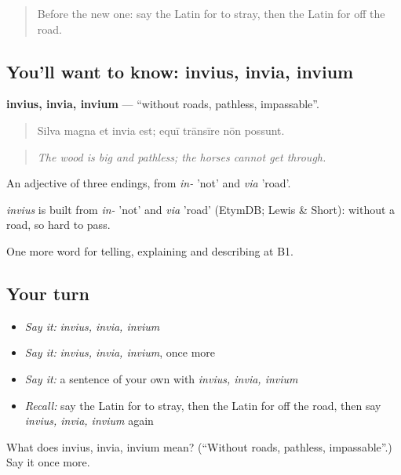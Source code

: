 \begin{quote}
Before the new one: say the Latin for to stray, then the Latin for off the road.
\end{quote}

\subsection*{You'll want to know: invius, invia, invium}
\textbf{invius, invia, invium} — \textquotedblleft{}without roads, pathless, impassable\textquotedblright{}.

\begin{quote}
Silva magna et invia est; equī trānsīre nōn possunt.
\end{quote}

\begin{quote}
\emph{The wood is big and pathless; the horses cannot get through.}
\end{quote}

An adjective of three endings, from \emph{in-} 'not' and \emph{via} 'road'.

\begin{cousinweb}
\emph{invius} is built from \emph{in-} 'not' and \emph{via} 'road' (EtymDB; Lewis \& Short): without a road, so hard to pass.
\end{cousinweb}

\begin{grammarlens}[title={What you've built}]
One more word for telling, explaining and describing at B1.
\end{grammarlens}

\subsection*{Your turn}
\begin{itemize}
\raggedright
  \item \emph{Say it:} \emph{invius, invia, invium}
  \item \emph{Say it:} \emph{invius, invia, invium}, once more
  \item \emph{Say it:} a sentence of your own with \emph{invius, invia, invium}
  \item \emph{Recall:} say the Latin for to stray, then the Latin for off the road, then say \emph{invius, invia, invium} again
\end{itemize}

\begin{tcolorbox}[breakable,colback=teal!4,colframe=teal!35!black,title={Before you move on}]
What does invius, invia, invium mean? (\textquotedblleft{}Without roads, pathless, impassable\textquotedblright{}.) Say it once more.
\end{tcolorbox}
